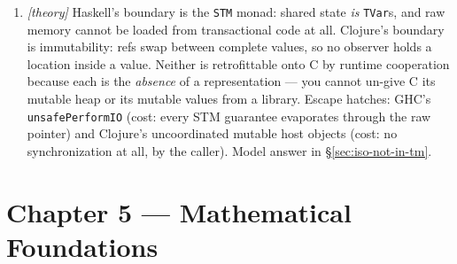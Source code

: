 \begin{enumerate}
          ``dual-granularity'' or explicit-transactional-access encoding).
          State one scenario where the workaround still leaks, e.g.\ a
          non-transactional write through an alias the compiler could not
          see at instrument time.
    \item \emph{[theory]} Haskell's boundary is the \texttt{STM} monad:
          shared state \emph{is} \texttt{TVar}s, and raw memory cannot be
          loaded from transactional code at all. Clojure's boundary is
          immutability: refs swap between complete values, so no observer
          holds a location inside a value. Neither is retrofittable onto C
          by runtime cooperation because each is the \emph{absence} of a
          representation --- you cannot un-give C its mutable heap or its
          mutable values from a library. Escape hatches: GHC's
          \texttt{unsafePerformIO} (cost: every STM guarantee evaporates
          through the raw pointer) and Clojure's uncoordinated mutable host
          objects (cost: no synchronization at all, by the caller).
          Model answer in \S\ref{sec:iso-not-in-tm}.
\end{enumerate}

\section*{Chapter 5 --- Mathematical Foundations}


